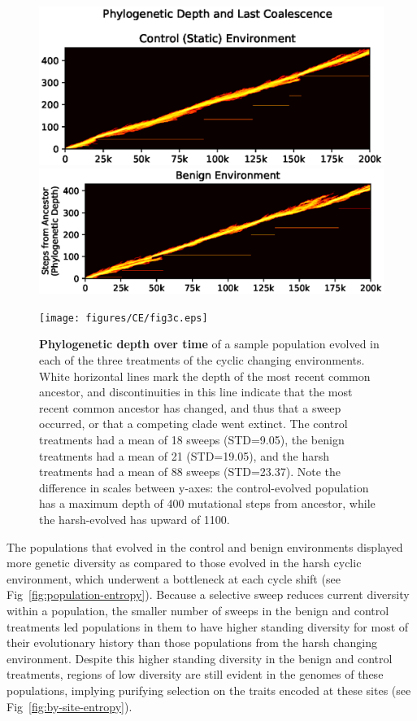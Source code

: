 \documentclass[10pt,letterpaper,final]{article}
\begin{document}
	\begin{figure}[!h]
	\includegraphics[trim={-0.88cm 0 0.25cm 0}, clip,width=0.85\columnwidth]{figures/CE/fig3a.eps}

	\includegraphics[trim={0.2cm 0 0.25cm 0},clip,width=0.85\columnwidth]{figures/CE/fig3b.eps}
	
	\texttt{[image: figures/CE/fig3c.eps]}
	\caption{\textbf{Phylogenetic depth over time} of a sample population evolved in each of the three treatments of the cyclic changing environments. White horizontal lines mark the depth of the most recent common ancestor, and discontinuities in this line indicate that the most recent common ancestor has changed, and thus that a sweep occurred, or that a competing clade went extinct. The control treatments had a mean of 18 sweeps (STD=9.05), the benign treatments had a mean of 21 (STD=19.05), and the harsh treatments had a mean of 88 sweeps (STD=23.37). Note the difference in scales between y-axes: the control-evolved population has a maximum depth of 400 mutational steps from ancestor, while the harsh-evolved has upward of 1100. %
	}\label{fig:flamegraph}
	\end{figure}

The populations that evolved in the control and benign environments displayed more genetic diversity as compared to those evolved in the harsh cyclic environment, which underwent a bottleneck at each cycle shift (see Fig~\ref{fig:population-entropy}). Because a selective sweep reduces current diversity within a population, the smaller number of sweeps in the benign and control treatments led populations in them to have higher standing diversity for most of their evolutionary history than those populations from the harsh changing environment. Despite this higher standing diversity in the benign and control treatments, regions of low diversity are still evident in the genomes of these populations, implying purifying selection on the traits encoded at these sites (see Fig~\ref{fig:by-site-entropy}).
\end{document}
